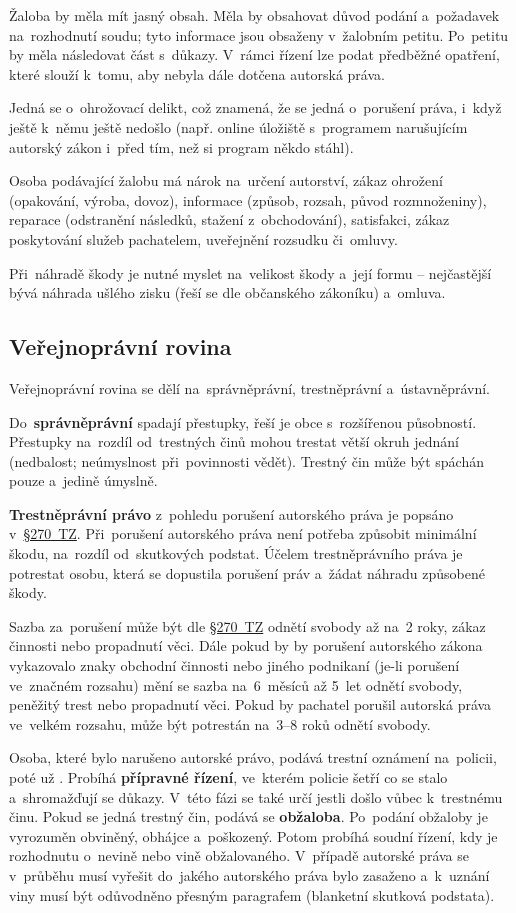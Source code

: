 Žaloba by měla mít jasný obsah. Měla by obsahovat důvod podání a~požadavek na~rozhodnutí soudu; tyto informace jsou obsaženy v~žalobním petitu. Po~petitu by měla následovat část s~důkazy. V~rámci řízení lze podat předběžné opatření, které slouží k~tomu, aby nebyla dále dotčena autorská práva.

Jedná se o~ohrožovací delikt, což znamená, že se jedná o~porušení práva, i~když ještě k~němu ještě nedošlo (např. online úložiště s~programem narušujícím autorský zákon i~před tím, než si program někdo stáhl).

Osoba podávající žalobu má nárok na~určení autorství, zákaz ohrožení (opakování, výroba, dovoz), informace (způsob, rozsah, původ rozmnoženiny), reparace (odstranění následků, stažení z~obchodování), satisfakci, zákaz poskytování služeb pachatelem, uveřejnění rozsudku či~omluvy.

Při~náhradě škody je nutné myslet na~velikost škody a~její formu -- nejčastější bývá náhrada ušlého zisku (řeší se dle občanského zákoníku) a~omluva.

\subsection{Veřejnoprávní rovina}

Veřejnoprávní rovina se dělí na~správněprávní, trestněprávní a~ústavněprávní.

Do~\textbf{správněprávní} spadají přestupky, řeší je obce s~rozšířenou působností. Přestupky na~rozdíl od~trestných činů mohou trestat větší okruh jednání (nedbalost; neúmyslnost při~povinnosti vědět). Trestný čin může být spáchán pouze a~jedině úmyslně.

\textbf{Trestněprávní právo} z~pohledu porušení autorského práva je popsáno v~\href{https://www.zakonyprolidi.cz/cs/2009-40#p270}{§270~TZ}. Při~porušení autorského práva není potřeba způsobit minimální škodu, na~rozdíl od~skutkových podstat. Účelem trestněprávního práva je potrestat osobu, která se dopustila porušení práv a~žádat náhradu způsobené škody.

Sazba za~porušení může být dle \href{https://www.zakonyprolidi.cz/cs/2009-40#p270}{§270~TZ} odnětí svobody až na~2 roky, zákaz činnosti nebo propadnutí věci. Dále pokud by by porušení autorského zákona vykazovalo znaky obchodní činnosti nebo jiného podnikaní (je-li porušení ve~značném rozsahu) mění se sazba na~6~měsíců až 5~let odnětí svobody, peněžitý trest nebo propadnutí věci. Pokud by pachatel porušil autorská práva ve~velkém rozsahu, může být potrestán na~3--8 roků odnětí svobody.

Osoba, které bylo narušeno autorské právo, podává trestní oznámení na~policii, poté už . Probíhá \textbf{přípravné řízení}, ve~kterém policie šetří co se stalo a~shromažďují se důkazy. V~této fázi se také určí jestli došlo vůbec k~trestnému činu. Pokud se jedná trestný čin, podává se \textbf{obžaloba}. Po~podání obžaloby je vyrozuměn obviněný, obhájce a~poškozený. Potom probíhá soudní řízení, kdy je rozhodnutu o~nevině nebo vině obžalovaného. V~případě autorské práva se v~průběhu musí vyřešit do~jakého autorského práva bylo zasaženo a~k~uznání viny musí být odůvodněno přesným paragrafem (blanketní skutková podstata).
